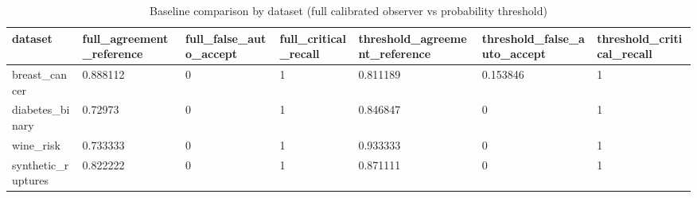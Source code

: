 \begin{table}[h]
\centering
\caption{Baseline comparison by dataset (full calibrated observer vs probability threshold)}
\label{tab:baseline\_by\_dataset}
\begin{tabular}{|l|l|l|l|l|l|l|}
\hline
dataset & full\_agreement\_reference & full\_false\_auto\_accept & full\_critical\_recall & threshold\_agreement\_reference & threshold\_false\_auto\_accept & threshold\_critical\_recall \\
\hline
breast\_cancer & 0.888112 & 0 & 1 & 0.811189 & 0.153846 & 1 \\
\hline
diabetes\_binary & 0.72973 & 0 & 1 & 0.846847 & 0 & 1 \\
\hline
wine\_risk & 0.733333 & 0 & 1 & 0.933333 & 0 & 1 \\
\hline
synthetic\_ruptures & 0.822222 & 0 & 1 & 0.871111 & 0 & 1 \\
\hline
\end{tabular}
\end{table}
